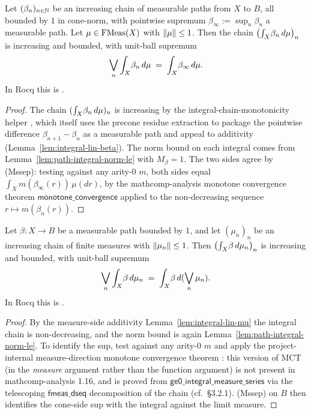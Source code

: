\begin{lemma}\label{lem:integral-omega-cont-path}
Let $(\beta_n)_{n \in \mathbb{N}}$ be an increasing chain of measurable
paths from $X$ to $B$, all bounded by $1$ in cone-norm, with
pointwise supremum $\beta_\infty := \sup_n \beta_n$ a measurable
path. Let $\mu \in \mathrm{FMeas}(X)$ with $\lVert \mu \rVert \leq 1$. Then the
chain $\bigl(\int_{X}\!\beta_n\,d\mu\bigr)_n$ is increasing and
bounded, with unit-ball supremum
\[
  \bigvee_n \int_{X}\!\beta_n\,d\mu
  \;=\; \int_{X}\!\beta_\infty\,d\mu.
\]
In Rocq this is
.
\rocqok
\end{lemma}

\begin{proof}
The chain $(\int_{X}\!\beta_n\,d\mu)_n$ is increasing by the
integral-chain-monotonicity helper
, which
itself uses the precone residue extraction
 to package the
pointwise difference $\beta_{n+1} - \beta_n$ as a measurable path and
appeal to additivity (Lemma~\ref{lem:integral-lin-beta}). The norm
bound on each integral comes from
Lemma~\ref{lem:path-integral-norm-le} with $M_\beta = 1$. The two
sides agree by (Mssep): testing against any arity-$0$ $m$, both
sides equal $\int_X m(\beta_\infty(r))\,\mu(dr)$, by the
mathcomp-analysis monotone convergence theorem
$\mathsf{monotone\_convergence}$ applied to the non-decreasing
sequence $r \mapsto m(\beta_n(r))$.
\end{proof}

\begin{lemma}\label{lem:integral-omega-cont-meas}
Let $\beta : X \to B$ be a measurable path bounded by $1$, and let
$(\mu_n)_n$ be an increasing chain of finite measures with
$\lVert \mu_n \rVert \leq 1$. Then
$\bigl(\int_{X}\!\beta\,d\mu_n\bigr)_n$ is increasing and bounded,
with unit-ball supremum
\[
  \bigvee_n \int_{X}\!\beta\,d\mu_n
  \;=\; \int_{X}\!\beta\,d(\bigvee_n \mu_n).
\]
In Rocq this is
.
\rocqok
\end{lemma}

\begin{proof}
By the measure-side additivity Lemma~\ref{lem:integral-lin-mu} the
integral chain is non-decreasing, and the norm bound is again
Lemma~\ref{lem:path-integral-norm-le}. To identify the sup, test
against any arity-$0$ $m$ and apply the project-internal
measure-direction monotone convergence theorem
: this version
of MCT (in the \emph{measure} argument rather than the function
argument) is not present in mathcomp-analysis 1.16, and is proved
from $\mathsf{ge0\_integral\_measure\_series}$ via the telescoping
$\mathsf{fmeas\_dseq}$ decomposition of the chain (cf.\ \S3.2.1).
(Mssep) on $B$ then identifies the cone-side sup with the
integral against the limit measure.
\end{proof}

